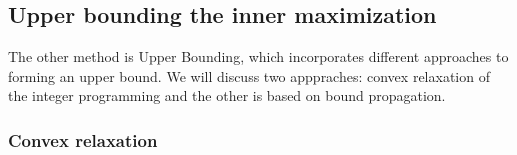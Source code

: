 \subsection{Upper bounding the inner maximization}


The other method is Upper Bounding, which incorporates different approaches to forming an upper bound. We will discuss two apppraches: convex relaxation of the integer programming and the other 
is based on bound propagation.

\subsubsection{Convex relaxation}






